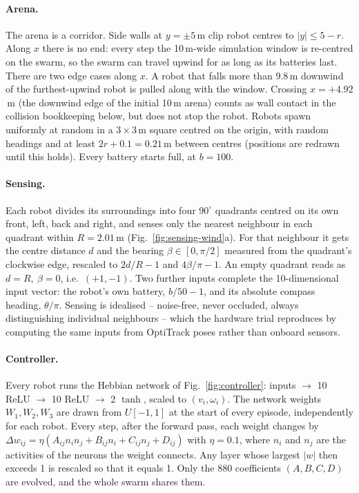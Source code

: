 \documentclass[11pt]{article}
\begin{document}
\paragraph{Arena.} The arena is a corridor. Side walls at $y = \pm 5$\,m clip robot centres to
$|y| \le 5 - r$. Along $x$ there is no end: every step the 10\,m-wide simulation window is
re-centred on the swarm, so the swarm can travel upwind for as long as its batteries last.
There are two edge cases along $x$. A robot that falls more than 9.8\,m downwind of the
furthest-upwind robot is pulled along with the window. Crossing $x = +4.92$\,m (the
downwind edge of the initial 10\,m arena) counts as wall contact in the collision bookkeeping
below, but does not stop the robot. Robots spawn uniformly at random in a
$3\times3$\,m square centred on the origin, with random headings and at least $2r + 0.1 =
0.21$\,m between centres (positions are redrawn until this holds). Every battery starts full,
at $b = 100$.

\paragraph{Sensing.} Each robot divides its surroundings into four $90^\circ$ quadrants
centred on its own front, left, back and right, and senses only the nearest neighbour in each
quadrant within $R = 2.01$\,m (Fig.~\ref{fig:sensing-wind}a). For that neighbour it gets the
centre distance $d$ and the bearing $\beta \in [0, \pi/2]$ measured from the quadrant's
clockwise edge, rescaled to $2d/R - 1$ and $4\beta/\pi - 1$. An empty quadrant reads as
$d = R,\ \beta = 0$, i.e.\ $(+1, -1)$. Two further inputs complete the 10-dimensional input
vector: the robot's own battery, $b/50 - 1$, and its absolute compass heading,
$\theta/\pi$. Sensing is idealised -- noise-free, never occluded, always distinguishing
individual neighbours -- which the hardware trial reproduces by computing the same inputs
from OptiTrack poses rather than onboard sensors.

\paragraph{Controller.} Every robot runs the Hebbian network of Fig.~\ref{fig:controller}:
inputs $\to$ 10 ReLU $\to$ 10 ReLU $\to$ 2 $\tanh$, scaled to $(v_i, \omega_i)$. The network
weights $W_1, W_2, W_3$ are drawn from $U[-1, 1]$ at the start of every episode, independently
for each robot. Every step, after the forward pass, each weight changes by
$\Delta w_{ij} = \eta(A_{ij} n_i n_j + B_{ij} n_i + C_{ij} n_j + D_{ij})$ with
$\eta = 0.1$, where $n_i$ and $n_j$ are the activities of the neurons the weight connects.
Any layer whose largest $|w|$ then exceeds 1 is rescaled so that it equals 1. Only the 880
coefficients $(A, B, C, D)$ are evolved, and the whole swarm shares them.
\end{document}
